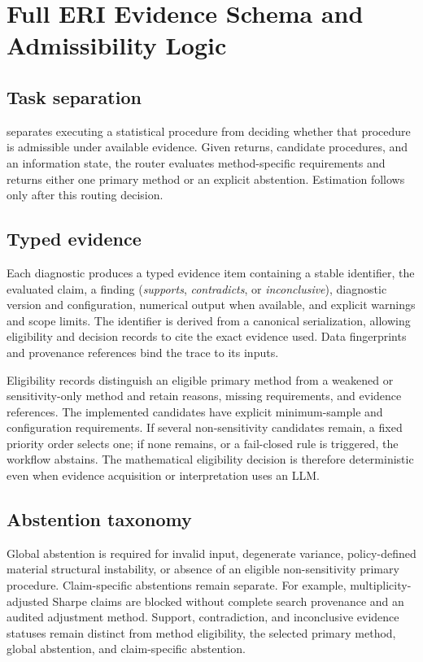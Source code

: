 \section{Full ERI Evidence Schema and Admissibility Logic}
\label{supp:evidence}

\subsection{Task separation}

\ERI{} separates executing a statistical procedure from deciding whether that
procedure is admissible under available evidence.  Given returns, candidate
procedures, and an information state, the router evaluates method-specific
requirements and returns either one primary method or an explicit abstention.
Estimation follows only after this routing decision.

\subsection{Typed evidence}

Each diagnostic produces a typed evidence item containing a stable identifier,
the evaluated claim, a finding (\emph{supports}, \emph{contradicts}, or
\emph{inconclusive}), diagnostic version and configuration, numerical output
when available, and explicit warnings and scope limits.  The identifier is
derived from a canonical serialization, allowing eligibility and decision
records to cite the exact evidence used.  Data fingerprints and provenance
references bind the trace to its inputs.

Eligibility records distinguish an eligible primary method from a weakened or
sensitivity-only method and retain reasons, missing requirements, and evidence
references.  The implemented candidates have explicit minimum-sample and
configuration requirements.  If several non-sensitivity candidates remain, a
fixed priority order selects one; if none remains, or a fail-closed rule is
triggered, the workflow abstains.  The mathematical eligibility decision is
therefore deterministic even when evidence acquisition or interpretation uses
an LLM.

\subsection{Abstention taxonomy}

Global abstention is required for invalid input, degenerate variance,
policy-defined material structural instability, or absence of an eligible
non-sensitivity primary procedure.  Claim-specific abstentions remain
separate.  For example, multiplicity-adjusted Sharpe claims are blocked
without complete search provenance and an audited adjustment method.  Support,
contradiction, and inconclusive evidence statuses remain distinct from method
eligibility, the selected primary method, global abstention, and
claim-specific abstention.

